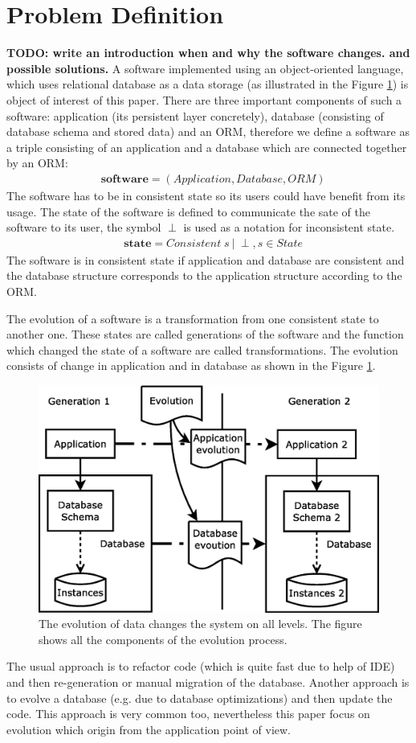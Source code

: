 \documentclass[runningheads]{comsis}
\begin{document}
\section{Problem Definition} 
\label{sec:problem}
\textbf{TODO: write an introduction when and why the software changes. and possible solutions.}
A software implemented using an object-oriented language, which uses relational database as a data storage (as illustrated in the Figure \ref{fig:evolution}) is object of interest of this paper. There are three important components of such a software: application (its persistent layer concretely), database (consisting of database schema and stored data) and an ORM, therefore we define a software as a triple consisting of an application and a database which are connected together by an ORM:
\begin{align}
& \mathbf{software} = ( Application, Database, ORM )
\end{align}
The software has to be in consistent state so its users could have benefit from its usage. The state of the software is defined to communicate the sate of the software to its user, the symbol $\perp$ is used as a notation for inconsistent state. 
\begin{align}
& \mathbf{state} = Consistent\; s \: | \: \perp, s \in State 
\end{align}
The software is in consistent state if application and database are consistent and the database structure corresponds to the application structure according to the ORM.

The evolution of a software is a transformation from one consistent state to another one. These states are called generations of the software and the function which changed the state of a software are called transformations. The evolution consists of change in application and in database as shown in the Figure \ref{fig:evolution}. 
\begin{figure}
\centering
	\includegraphics[width=.7\textwidth]{./images/evolution_simple}
	\caption{The evolution of data changes the system on all levels. The figure shows all the components of the evolution process.}
	\label{fig:evolution}
\end{figure}
The usual approach is to refactor code (which is quite fast due to help of IDE) and then re-generation or manual migration of the database. Another approach is to evolve a database (e.g. due to database optimizations) and then update the code. This approach is very common too, nevertheless this paper focus on evolution which origin from the application point of view. 
\end{document}
